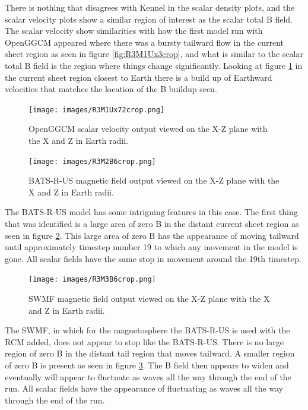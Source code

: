 There is nothing that disagrees with Kennel in the scalar density plots, and the
scalar velocity plots show a similar region of interest as the scalar total B
field. The scalar velocity show similarities with how the first model run with
OpenGGCM appeared where there was a bursty tailward flow in the current sheet
region as seen in figure \ref{fig:R3M1Ux3crop}, and what is similar to the
scalar total B field is the region where things change significantly. Looking at
figure \ref{fig:R3M1Ux72crop} in the current sheet region closest to Earth there
is a build up of Earthward velocities that matches the location of the B
buildup seen.
\begin{figure}
	\centering
	\texttt{[image: images/R3M1Ux72crop.png]}
	\caption{OpenGGCM scalar velocity output viewed on the X-Z plane
	with the X and Z in Earth radii. }
    \label{fig:R3M1Ux72crop}
	\figSpace
\end{figure}

\begin{figure}
	\centering
	\texttt{[image: images/R3M2B6crop.png]}
	\caption{BATS-R-US magnetic field output viewed on the X-Z plane
	with the X and Z in Earth radii. }
    \label{fig:R3M2B6crop}
	\figSpace
\end{figure}
The BATS-R-US model has some intriguing features in this case. The first thing
that was identified is a large area of zero B in the distant current sheet
region as seen in figure \ref{fig:R3M2B6crop}. This large area of zero B has the
appearance of moving tailward until approximately timestep number 19 to which
any movement in the model is gone. All scalar fields have the same stop in
movement around the 19th timestep.

\begin{figure}
	\centering
	\texttt{[image: images/R3M3B6crop.png]}
	\caption{SWMF magnetic field output viewed on the X-Z plane
	with the X and Z in Earth radii. }
    \label{fig:R3M3B6crop}
	\figSpace
\end{figure}
The SWMF, in which for the magnetosphere the BATS-R-US is used with the RCM
added, does not appear to stop like the BATS-R-US. There is no large region of
zero B in the distant tail region that moves tailward. A smaller region of zero
B is present as seen in figure \ref{fig:R3M3B6crop}. The B field then appears to
widen and eventually will appear to fluctuate as waves all the way through the
end of the run. All scalar fields have the appearance of fluctuating as waves
all the way through the end of the run.

